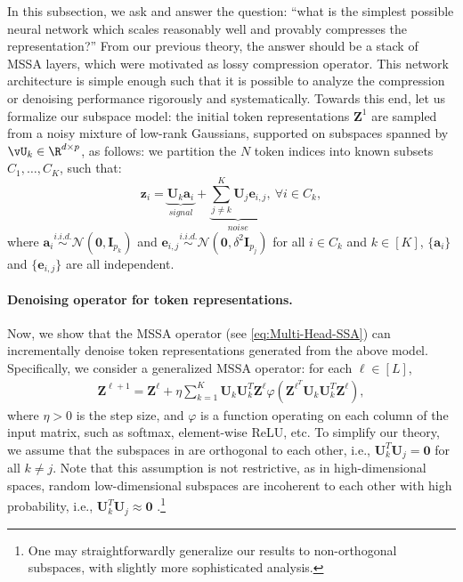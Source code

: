 \documentclass[../../book-main.tex]{subfiles}
\begin{document}
In this subsection, we ask and answer the question: ``what is the
simplest possible neural network which scales reasonably well and
provably compresses the representation?'' From our previous theory,
the answer should be a stack of MSSA layers, which were motivated as
lossy compression operator. This network architecture is simple
enough such that it is possible to analyze the compression or
denoising performance rigorously and systematically. Towards this
end, let us formalize our subspace model: the initial token
representations $\bm Z^{1}$ are sampled from a noisy mixture of
low-rank Gaussians, supported on subspaces spanned by \(\vU_{k} \in
\R^{d \times p}\), as follows: we partition the \(N\) token indices
into known subsets \(C_{1}, \dots, C_{K}\), such that:
\begin{equation}\label{def:MoG}
    \bm z_i = \underbrace{\bm U_{k} \bm a_i}_{signal} +
    \underbrace{\sum_{j \neq k}^K \bm U_j \bm e_{i,j}}_{
    noise},\ \forall i \in C_k,
\end{equation}
where $\bm{a}_i \overset{i.i.d.}{\sim}
\mathcal{N}(\bm{0},\bm{I}_{p_k})$ and $\bm{e}_{i,j}
\overset{i.i.d.}{\sim} \mathcal{N}(\bm{0},\delta^2\bm{I}_{p_j})$
for all $i \in C_k$ and $k \in [K]$, $\{\bm{a}_i\}$ and
$\{\bm{e}_{i,j}\}$ are all independent.

\paragraph{Denoising operator for token representations.} Now, we
show that the MSSA operator (see \eqref{eq:Multi-Head-SSA}) can
incrementally denoise token representations generated from the above
model. Specifically, we consider a generalized MSSA operator: for each
$\ell \in [L]$,
\begin{align}\label{eq:MSSA}
    \bm Z^{\ell+1} =  \bm Z^{\ell} + \eta \sum_{k=1}^K \bm U_k\bm
    U_k^T \bm Z^{\ell} \varphi(\bm Z^{\ell^T}\bm U_k\bm
    U_k^T\bm Z^{\ell}),
\end{align}
where $\eta > 0$ is the step size, and $\varphi$ is a function
operating on each column of the input matrix, such as softmax,
element-wise ReLU, etc. To simplify our theory, we assume that the
subspaces in  are orthogonal to each other, i.e., $\bm
U_k^T\bm U_j = \bm 0$ for all $k \neq j$. Note that this assumption
is not restrictive, as in high-dimensional spaces, random
low-dimensional subspaces are incoherent to each other with high
probability, i.e., $\bm U_k^T\bm U_j \approx \bm 0$
\citep{Wright-Ma-2022}.\footnote{One may straightforwardly generalize
    our results to non-orthogonal subspaces, with slightly more
sophisticated analysis.}
\end{document}
